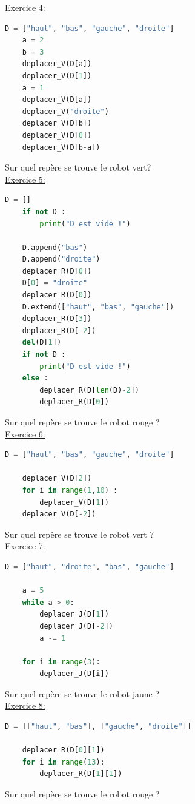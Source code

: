 \underline{Exercice 4:}
\begin{lstlisting}[language=Python]
    D = ["haut", "bas", "gauche", "droite"]
    a = 2
    b = 3
    deplacer_V(D[a])
    deplacer_V(D[1])
    a = 1
    deplacer_V(D[a])
    deplacer_V("droite")
    deplacer_V(D[b])
    deplacer_V(D[0])
    deplacer_V(D[b-a])
\end{lstlisting}
Sur quel repère se trouve le robot vert?\\

\underline{Exercice 5:}
\begin{lstlisting}[language=Python]
    D = []
    if not D :
        print("D est vide !")

    D.append("bas")
    D.append("droite")
    deplacer_R(D[0])
    D[0] = "droite"
    deplacer_R(D[0])
    D.extend(["haut", "bas", "gauche"])
    deplacer_R(D[3])
    deplacer_R(D[-2])
    del(D[1])
    if not D :
        print("D est vide !")
    else :
        deplacer_R(D[len(D)-2])
        deplacer_R(D[0])
\end{lstlisting}
Sur quel repère se trouve le robot rouge ?\\

\underline{Exercice 6:}
\begin{lstlisting}[language=Python]
    D = ["haut", "bas", "gauche", "droite"]

    deplacer_V(D[2])
    for i in range(1,10) :
        deplacer_V(D[1])
    deplacer_V(D[-2])
\end{lstlisting}
Sur quel repère se trouve le robot vert ?\\

\underline{Exercice 7:}
\begin{lstlisting}[language=Python]
    D = ["haut", "droite", "bas", "gauche"]

    a = 5
    while a > 0:
        deplacer_J(D[1])
        deplacer_J(D[-2])
        a -= 1

    for i in range(3):
        deplacer_J(D[i])
\end{lstlisting}
Sur quel repère se trouve le robot jaune ?\\

\underline{Exercice 8:}
\begin{lstlisting}[language=Python]
    D = [["haut", "bas"], ["gauche", "droite"]]

    deplacer_R(D[0][1])
    for i in range(13):
        deplacer_R(D[1][1])
\end{lstlisting}
Sur quel repère se trouve le robot rouge ?\\

